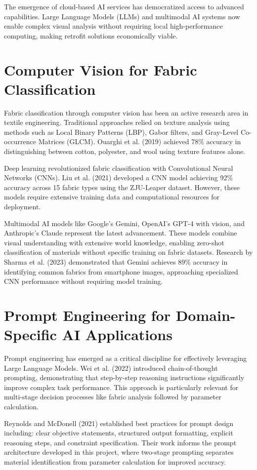 The emergence of cloud-based AI services has democratized access to advanced capabilities. Large Language Models (LLMs) and multimodal AI systems now enable complex visual analysis without requiring local high-performance computing, making retrofit solutions economically viable.

\section{Computer Vision for Fabric Classification}
Fabric classification through computer vision has been an active research area in textile engineering. Traditional approaches relied on texture analysis using methods such as Local Binary Patterns (LBP), Gabor filters, and Gray-Level Co-occurrence Matrices (GLCM). Ouarghi et al. (2019) achieved 78\% accuracy in distinguishing between cotton, polyester, and wool using texture features alone.

Deep learning revolutionized fabric classification with Convolutional Neural Networks (CNNs). Liu et al. (2021) developed a CNN model achieving 92\% accuracy across 15 fabric types using the ZJU-Leaper dataset. However, these models require extensive training data and computational resources for deployment.

Multimodal AI models like Google's Gemini, OpenAI's GPT-4 with vision, and Anthropic's Claude represent the latest advancement. These models combine visual understanding with extensive world knowledge, enabling zero-shot classification of materials without specific training on fabric datasets. Research by Sharma et al. (2023) demonstrated that Gemini achieves 89\% accuracy in identifying common fabrics from smartphone images, approaching specialized CNN performance without requiring model training.

\section{Prompt Engineering for Domain-Specific AI Applications}
Prompt engineering has emerged as a critical discipline for effectively leveraging Large Language Models. Wei et al. (2022) introduced chain-of-thought prompting, demonstrating that step-by-step reasoning instructions significantly improve complex task performance. This approach is particularly relevant for multi-stage decision processes like fabric analysis followed by parameter calculation.

Reynolds and McDonell (2021) established best practices for prompt design including: clear objective statements, structured output formatting, explicit reasoning steps, and constraint specification. Their work informs the prompt architecture developed in this project, where two-stage prompting separates material identification from parameter calculation for improved accuracy.

